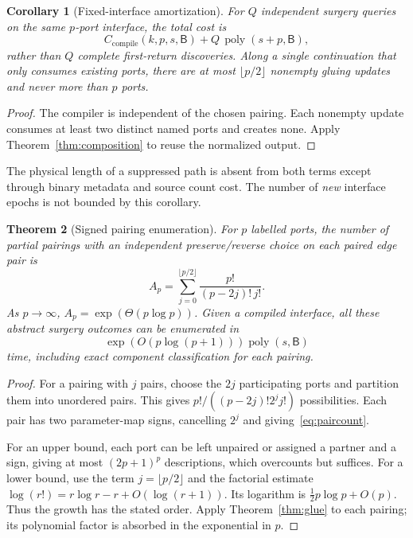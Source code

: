 \documentclass[11pt]{article}
\newtheorem{theorem}{Theorem}[section]
\newtheorem{corollary}[theorem]{Corollary}
\theoremstyle{definition}
\theoremstyle{remark}\newtheorem{remark}[theorem]{Remark}
\newcommand{\bits}{\mathsf B}
\begin{document}
\begin{corollary}[Fixed-interface amortization]\label{cor:amortize}
For $Q$ independent surgery queries on the same $p$-port interface, the total cost is
\[
 C_{\mathrm{compile}}(k,p,s,\bits)
       +Q\,\operatorname{poly}(s+p,\bits),
\]
rather than $Q$ complete first-return discoveries. Along a single continuation that only consumes existing ports, there are at most $\lfloor p/2\rfloor$ nonempty gluing updates and never more than $p$ ports.
\end{corollary}
\begin{proof}
The compiler is independent of the chosen pairing. Each nonempty update consumes at least two distinct named ports and creates none. Apply Theorem~\ref{thm:composition} to reuse the normalized output.
\end{proof}

The physical length of a suppressed path is absent from both terms except through binary metadata and source count cost. The number of \emph{new} interface epochs is not bounded by this corollary.

\begin{theorem}[Signed pairing enumeration]\label{thm:enumeration}
For $p$ labelled ports, the number of partial pairings with an independent preserve/reverse choice on each paired edge pair is
\begin{equation}\label{eq:paircount}
 A_p=\sum_{j=0}^{\lfloor p/2\rfloor}
                   \frac{p!}{(p-2j)!\,j!}.
\end{equation}
As $p\to\infty$, $A_p=\exp(\Theta(p\log p))$. Given a compiled interface, all these abstract surgery outcomes can be enumerated in
\[
          \exp(O(p\log(p+1)))\operatorname{poly}(s,\bits)
\]
time, including exact component classification for each pairing.
\end{theorem}
\begin{proof}
For a pairing with $j$ pairs, choose the $2j$ participating ports and partition them into unordered pairs. This gives $p!/((p-2j)!2^j j!)$ possibilities. Each pair has two parameter-map signs, cancelling $2^j$ and giving~\eqref{eq:paircount}.

For an upper bound, each port can be left unpaired or assigned a partner and a sign, giving at most $(2p+1)^p$ descriptions, which overcounts but suffices. For a lower bound, use the term $j=\lfloor p/2\rfloor$ and the factorial estimate $\log(r!)=r\log r-r+O(\log(r+1))$. Its logarithm is $\tfrac12p\log p+O(p)$. Thus the growth has the stated order. Apply Theorem~\ref{thm:glue} to each pairing; its polynomial factor is absorbed in the exponential in $p$.
\end{proof}
\end{document}
